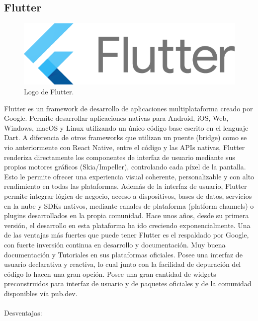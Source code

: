 \subsection{Flutter}
\begin{figure}[h]
    \centering
    \includegraphics[scale=0.15]{Graphics/flutter_logo.png}
    \caption{Logo de Flutter.}
    \label{fig:figura12}
\end{figure}
Flutter es un framework de desarrollo de aplicaciones multiplataforma creado por Google. Permite desarrollar aplicaciones nativas para Android, iOS, Web, Windows, macOS y Linux utilizando un único código base escrito en el lenguaje Dart.
A diferencia de otros frameworks que utilizan un puente (bridge) como se vio anteriormente con React Native, entre el código y las APIs nativas, Flutter renderiza directamente los componentes de interfaz de usuario mediante sus propios motores gráficos (Skia/Impeller), controlando cada píxel de la pantalla. Esto le permite ofrecer una experiencia visual coherente, personalizable y con alto rendimiento en todas las plataformas.
Además de la interfaz de usuario, Flutter permite integrar lógica de negocio, acceso a dispositivos, bases de datos, servicios en la nube y SDKs nativos, mediante canales de plataforma (platform channels) o plugins desarrollados en la propia comunidad.
Hace unos años, desde su primera versión, el desarrollo en esta plataforma ha ido creciendo exponencialmente. Una de las ventajas más fuertes que puede tener Flutter es el respaldado por Google, con fuerte inversión continua en desarrollo y documentación.
Muy buena documentación y Tutoriales en sus plataformas oficiales.
Posee una interfaz de usuario declarativa y reactiva, lo cual junto con la facilidad de depuración del código lo hacen una gran opción. Posee una gran cantidad de widgets preconstruidos para interfaz de usuario y de paquetes oficiales y de la comunidad disponibles vía pub.dev.\\\\
Desventajas:
